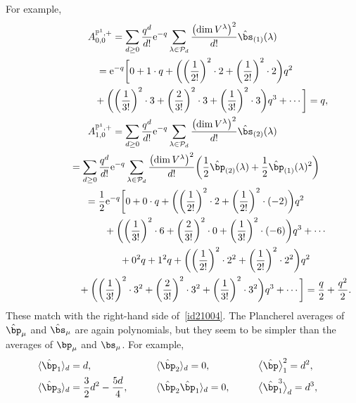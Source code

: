 \documentclass[pdftex]{sigma}
\newcommand{\corr}[1]{\langle {#1} \rangle}
\newcommand{\bP}{\mathbb{P}}
\numberwithin{equation}{section}
\begin{document}
For example,
\begin{gather*}
A_{0,0}^{\bP^1,+} = \sum_{d\geq 0} \frac{q^d}{d!}{\rm e}^{-q}
\sum_{\lambda\in \mathcal{P}_d} \frac{\bigl(\dim V^\lambda\bigr)^2}{d!}
\hat{\bs}_{(1)}(\lambda)\\ \hphantom{A_{0,0}^{\bP^1,+}}{}
 = {\rm e}^{-q}\biggl[0 + 1\cdot q + \biggl(\biggl(\frac{1}{2!}\biggr)^2 \cdot 2
+ \biggl(\frac{1}{2!}\biggr)^2 \cdot 2\biggr) q^2 \\ \hphantom{A_{0,0}^{\bP^1,+}={\rm e}^{-q}\biggl[}{}
 + \biggl( \biggl(\frac{1}{3!}\biggr)^2 \cdot 3
+ \biggl(\frac{2}{3!}\biggr)^2\cdot 3
+ \biggl(\frac{1}{3!}\biggr)^2 \cdot 3\biggr) q^3 + \cdots\biggr]
 = q,
\\
A_{1,0}^{\bP^1,+} = \sum_{d\geq 0} \frac{q^d}{d!}{\rm e}^{-q}
\sum_{\lambda\in \mathcal{P}_d} \frac{\bigl(\dim V^\lambda\bigr)^2}{d!}
\hat{\bs}_{(2)}(\lambda)\\ \hphantom{A_{1,0}^{\bP^1,+}}{}
 = \sum_{d\geq 0} \frac{q^d}{d!}{\rm e}^{-q}
\sum_{\lambda\in \mathcal{P}_d} \frac{\bigl(\dim V^\lambda\bigr)^2}{d!} \biggl(\frac{1}{2}\hat{\bp}_{(2)}(\lambda)
+ \frac{1}{2} \hat{\bp}_{(1)}(\lambda)^2\biggr) \\ \hphantom{A_{1,0}^{\bP^1,+}}{}
 = \frac{1}{2} {\rm e}^{-q}\biggl[0+ 0 \cdot q + \biggl( \biggl(\frac{1}{2!}\biggr)^2 \cdot 2
+ \biggl(\frac{1}{2!}\biggr)^2 \cdot (-2) \biggr) q^2 \\ \hphantom{A_{1,0}^{\bP^1,+}=\frac{1}{2} {\rm e}^{-q}\biggl[}{}
 + \biggl( \biggl(\frac{1}{3!}\biggr)^2 \cdot 6
+ \biggl(\frac{2}{3!}\biggr)^2\cdot 0
+ \biggl(\frac{1}{3!}\biggr)^2 \cdot (-6) \biggr) q^3 + \cdots \\ \hphantom{A_{1,0}^{\bP^1,+}=\frac{1}{2} {\rm e}^{-q}\biggl[}{}
 + 0^2q + 1^2q
+ \biggl( \biggl(\frac{1}{2!}\biggr)^2 \cdot 2^2
+ \biggl(\frac{1}{2!}\biggr)^2 \cdot 2^2 \biggr) q^2 \\ \hphantom{A_{1,0}^{\bP^1,+}=\frac{1}{2} {\rm e}^{-q}\biggl[}{}
 + \biggl( \biggl(\frac{1}{3!}\biggr)^2 \cdot 3^2
+ \biggl(\frac{2}{3!}\biggr)^2 \cdot 3^2
+ \biggl(\frac{1}{3!}\biggr)^2 \cdot 3^2\biggr) q^3 + \cdots\biggr]
 = \frac{q}{2} + \frac{q^2}{2}.
\end{gather*}
These match with the right-hand side of~\eqref{id21004}. %
The Plancherel averages of $\hat{\bp}_\mu$ and $\hat{\bs}_\mu$
are again polynomials, but they seem to be simpler than
the averages of $\bp_\mu$ and $\bs_\mu$.
For example,
\begin{alignat*}{4}
&\corr{\hat{\bp}_1}_d = d,\qquad&&
\corr{\hat{\bp}_2}_d = 0,\qquad&&
\bigl\langle\hat{\bp}\bigr\rangle_1^2 = d^2,& \\
&\corr{\hat{\bp}_3}_d = \frac{3}{2}d^2 - \frac{5d}{4},\qquad&&
\corr{\hat{\bp}_2\hat{\bp}_1}_d = 0,\qquad&&
\bigl\langle\hat{\bp}_1^3\bigr\rangle_d = d^3, &
\end{alignat*}
\end{document}
